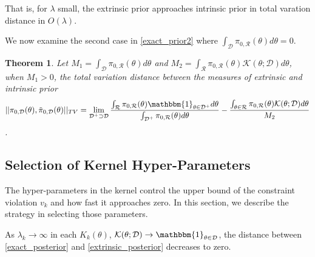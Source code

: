 \documentclass[10pt]{article}
\newtheorem{theorem}{Theorem}
\newcommand{\mc}[1]{\mathcal{#1}}
\DeclareMathOperator{\1}{\mathbbm{1}}
\begin{document}
That is, for $\lambda$ small, the extrinsic prior approaches intrinsic prior in total varation distance in $O(\lambda)$.

We now examine the second case in \eqref{exact_prior2} where ${ \int_{\mc D} \pi_{0,\mc R}(\theta)d\theta }=0$.


\begin{theorem}
Let $M_1= \int_{\mc D} \pi_{0,\mc R}(\theta)d\theta$ and $M_2 = \int_{\mc R} \pi_{0,\mc R}(\theta) \mc K(\theta;\mc D)d\theta$, when $M_1>0$, the total variation distance between the measures of extrinsic and intrinsic prior
$$||\pi_{0,\mc D}(\theta), \tilde{\pi}_{0,\mc D}(\theta) ||_{TV} = \lim_{\mc D^+\supset \mc D} \frac{\int_{\mc R} \pi_{0,\mc R}(\theta) \mathbbm{1}_{\theta\in \mc D^+ } d\theta}{ \int_{\mc D^+} \pi_{0,\mc R}(\theta)d\theta }
 -  \frac{\int_{\theta  \in \mc R } \pi_{0,\mc R}(\theta) \mc K(\theta;\mc D)d\theta}{M_2}$$.
\end{theorem}

\subsection{Selection of Kernel Hyper-Parameters}

The hyper-parameters in the kernel control the upper bound of the constraint violation $v_k$ and how fast it approaches zero. In this section, we describe the strategy in selecting those parameters.

As $\lambda_k\rightarrow \infty$ in each $K_k(\theta)$, $\mc{K}(\theta; \mc D)\rightarrow \mathbbm{1}_{\theta\in \mc D}$, the distance between \eqref{exact_posterior} and \eqref{extrinsic_posterior} decreases to zero.
\end{document}
